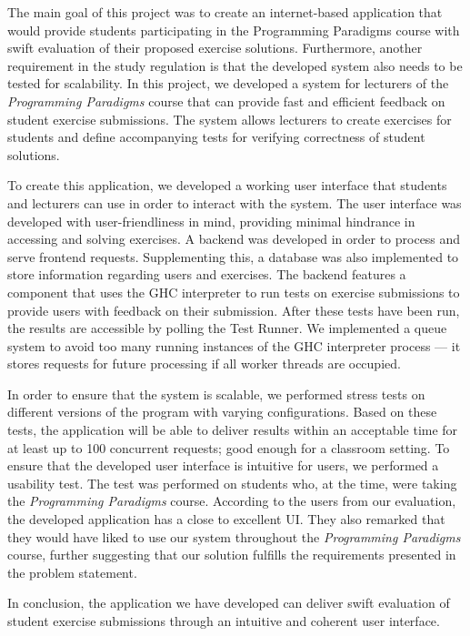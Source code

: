 The main goal of this project was to create an internet-based application that would provide students participating in the Programming Paradigms course with swift evaluation of their proposed exercise solutions.
Furthermore, another requirement in the study regulation is that the developed system also needs to be tested for scalability.
In this project, we developed a system for lecturers of the \textit{Programming Paradigms} course that can provide fast and efficient feedback on student exercise submissions.
The system allows lecturers to create exercises for students and define accompanying tests for verifying correctness of student solutions.

To create this application, we developed a working user interface that students and lecturers can use in order to interact with the system.
The user interface was developed with user-friendliness in mind, providing minimal hindrance in accessing and solving exercises.
A backend was developed in order to process and serve frontend requests.
Supplementing this, a database was also implemented to store information regarding users and exercises.
The backend features a component that uses the GHC interpreter to run tests on exercise submissions to provide users with feedback on their submission.
After these tests have been run, the results are accessible by polling the Test Runner.
We implemented a queue system to avoid too many running instances of the GHC interpreter process --- it stores requests for future processing if all worker threads are occupied.

In order to ensure that the system is scalable, we performed stress tests on different versions of the program with varying configurations.
Based on these tests, the application will be able to deliver results within an acceptable time for at least up to 100 concurrent requests; good enough for a classroom setting.
To ensure that the developed user interface is intuitive for users, we performed a usability test.
The test was performed on students who, at the time, were taking the \textit{Programming Paradigms} course.
According to the users from our evaluation, the developed application has a close to excellent UI.
They also remarked that they would have liked to use our system throughout the \textit{Programming Paradigms} course, further suggesting that our solution fulfills the requirements presented in the problem statement.

In conclusion, the application we have developed can deliver swift evaluation of student exercise submissions through an intuitive and coherent user interface.